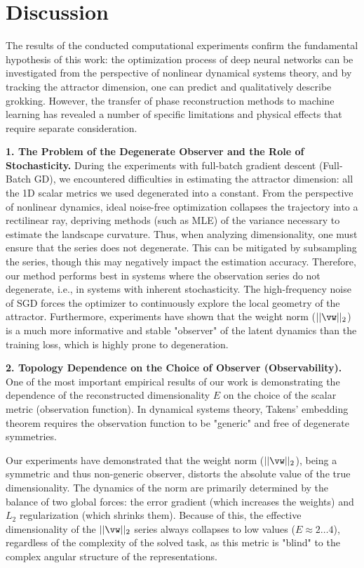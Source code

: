 \documentclass{article}
\begin{document}
\section{Discussion}\label{sec:disc}

The results of the conducted computational experiments confirm the fundamental hypothesis of this work: the optimization process of deep neural networks can be investigated from the perspective of nonlinear dynamical systems theory, and by tracking the attractor dimension, one can predict and qualitatively describe grokking. However, the transfer of phase reconstruction methods to machine learning has revealed a number of specific limitations and physical effects that require separate consideration.

\textbf{1. The Problem of the Degenerate Observer and the Role of Stochasticity.}
During the experiments with full-batch gradient descent (Full-Batch GD), we encountered difficulties in estimating the attractor dimension: all the 1D scalar metrics we used degenerated into a constant. From the perspective of nonlinear dynamics, ideal noise-free optimization collapses the trajectory into a rectilinear ray, depriving methods (such as MLE) of the variance necessary to estimate the landscape curvature. Thus, when analyzing dimensionality, one must ensure that the series does not degenerate. This can be mitigated by subsampling the series, though this may negatively impact the estimation accuracy. Therefore, our method performs best in systems where the observation series do not degenerate, i.e., in systems with inherent stochasticity. The high-frequency noise of SGD forces the optimizer to continuously explore the local geometry of the attractor. Furthermore, experiments have shown that the weight norm ($||\vw||_2$) is a much more informative and stable "observer" of the latent dynamics than the training loss, which is highly prone to degeneration.

\textbf{2. Topology Dependence on the Choice of Observer (Observability).}
One of the most important empirical results of our work is demonstrating the dependence of the reconstructed dimensionality $E$ on the choice of the scalar metric (observation function). In dynamical systems theory, Takens' embedding theorem requires the observation function to be "generic" and free of degenerate symmetries.

Our experiments have demonstrated that the weight norm ($||\vw||_2$), being a symmetric and thus non-generic observer, distorts the absolute value of the true dimensionality. The dynamics of the norm are primarily determined by the balance of two global forces: the error gradient (which increases the weights) and $L_2$ regularization (which shrinks them). Because of this, the effective dimensionality of the $||\vw||_2$ series always collapses to low values ($E \approx 2\dots 4$), regardless of the complexity of the solved task, as this metric is "blind" to the complex angular structure of the representations.
\end{document}
